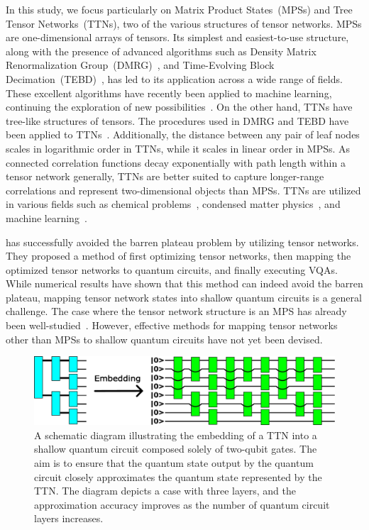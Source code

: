 \documentclass[12pt,dvipdfmx,twoside,openright]{report}
\begin{document}
In this study, we focus particularly on Matrix Product States~(MPSs) and Tree Tensor Networks~(TTNs), two of the various structures of tensor networks.
MPSs are one-dimensional arrays of tensors.
Its simplest and easiest-to-use structure, along with the presence of advanced algorithms such as Density Matrix Renormalization Group~(DMRG)~\cite{dmrg}, and Time-Evolving Block Decimation~(TEBD)~\cite{tebd}, has led to its application across a wide range of fields.
These excellent algorithms have recently been applied to machine learning, continuing the exploration of new possibilities~\cite{MPSsupervised,MPSgenerative}.
On the other hand, TTNs have tree-like structures of tensors.
The procedures used in DMRG and TEBD have been applied to TTNs~\cite{dmrg-ttn,tebd-ttn}.
Additionally, the distance between any pair of leaf nodes scales in logarithmic order in TTNs, while it scales in linear order in MPSs.
As connected correlation functions decay exponentially with path length within a tensor network generally, TTNs are better suited to capture longer-range correlations and represent two-dimensional objects than MPSs.
TTNs are utilized in various fields such as chemical problems~\cite{chemical1,chemical2}, condensed matter physics~\cite{condmat1,condmat2,condmat3}, and machine learning~\cite{ml1,ml2}.

\cite{rudolph2023synergistic} has successfully avoided the barren plateau problem by utilizing tensor networks.
They proposed a method of first optimizing tensor networks, then mapping the optimized tensor networks to quantum circuits, and finally executing VQAs.
While numerical results have shown that this method can indeed avoid the barren plateau, mapping tensor network states into shallow quantum circuits is a general challenge.
The case where the tensor network structure is an MPS has already been well-studied~\cite{EncodingMPS,mpsdecomp,mpsoptim,mpspreparation}.
However, effective methods for mapping tensor networks other than MPSs to shallow quantum circuits have not yet been devised.
\begin{figure}
    \centering
    \includegraphics[width=\linewidth]{fig-task-setting.pdf}
    \caption{A schematic diagram illustrating the embedding of a TTN into a shallow quantum circuit composed solely of two-qubit gates. The aim is to ensure that the quantum state output by the quantum circuit closely approximates the quantum state represented by the TTN. The diagram depicts a case with three layers, and the approximation accuracy improves as the number of quantum circuit layers increases.}
    \label{fig:task-setting}
\end{figure}
\end{document}
